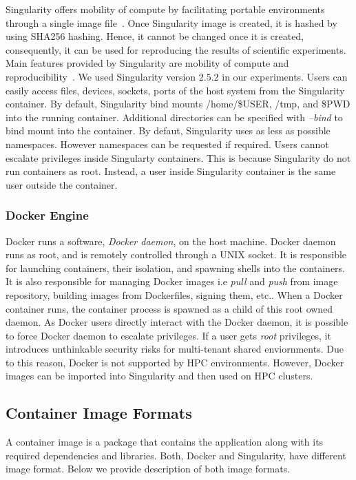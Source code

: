 \documentclass[a4paper,num-refs]{oup-contemporary}
\begin{document}
Singularity offers mobility of compute by facilitating portable environments 
through a single image file~\cite{kurtzer2016singularity}. Once Singularity image
is created, it is hashed by using SHA256 hashing. Hence, it cannot be changed
once it is created, consequently, it can be used for reproducing the results of
scientific experiments. Main features provided by
Singularity are mobility of compute and reproducibility~\cite{kurtzer2017singularity}.
We used Singularity version $2.5.2$ in our experiments.
Users can easily access files, devices, sockets, ports of the host system from
the Singularity container. By default, Singularity bind mounts /home/\$USER, /tmp, and \$PWD
into the running container. Additional directories can be specified with \textit{--bind}
to bind mount into the container. By defaut, Singularity uses as less as possible namespaces.
However namespaces can be requested if required. Users cannot escalate privileges inside
Singularty containers. This is because Singularity do not run containers as root.
Instead, a user inside Singularity container is the same user outside the container.


\subsubsection{Docker Engine}

Docker runs a software, \textit{Docker daemon}, on the host machine.
Docker daemon runs as root, and is remotely controlled through a
UNIX socket. It is responsible for launching containers, their
isolation, and spawning shells into the containers. It is also
responsible for managing Docker images i.e \textit{pull} and \textit{push}
from image repository, building images from Dockerfiles, signing them, etc..
When a Docker container runs, the container process is spawned as a
child of this root owned daemon. As Docker users directly interact with the
Docker daemon, it is possible to force Docker daemon to escalate privileges.
If a user gets \textit{root} privileges, it introduces unthinkable security risks
for multi-tenant shared enviornments. Due to this reason, Docker is not
supported by HPC environments. However, Docker images can be imported into
Singularity and then used on HPC clusters.

\subsection{Container Image Formats}

A container image is a package that contains the application along with its
required dependencies and libraries.
Both, Docker and Singularity, have different image format. Below we provide description of both image
formats.
\end{document}

